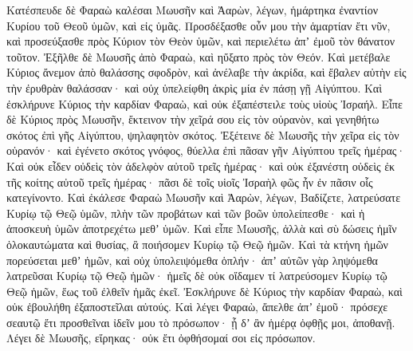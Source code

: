 {\par }{\PP {}Κατέσπευδε δὲ Φαραὼ καλέσαι Μωυσῆν καὶ Ἀαρὼν, λέγων, ἡμάρτηκα ἐναντίον Κυρίου τοῦ Θεοῦ ὑμῶν, καὶ εἰς ὑμᾶς.
Προσδέξασθε οὖν μου τὴν ἁμαρτίαν ἔτι νῦν, καὶ προσεύξασθε πρὸς Κύριον τὸν Θεὸν ὑμῶν, καὶ περιελέτω ἀπʼ ἐμοῦ τὸν θάνατον τοῦτον.
Ἐξῆλθε δὲ Μωυσῆς ἀπὸ Φαραὼ, καὶ ηὔξατο πρὸς τὸν Θεόν.
Καὶ μετέβαλε Κύριος ἄνεμον ἀπὸ θαλάσσης σφοδρὸν, καὶ ἀνέλαβε τὴν ἀκρίδα, καὶ ἔβαλεν αὐτὴν εἰς τὴν ἐρυθρὰν θαλάσσαν· καὶ οὐχ ὑπελείφθη ἀκρὶς μία ἐν πάσῃ γῇ Αἰγύπτου.
Καὶ ἐσκλήρυνε Κύριος τὴν καρδίαν Φαραὼ, καὶ οὐκ ἐξαπέστειλε τοὺς υἱοὺς Ἰσραήλ.
Εἶπε δὲ Κύριος πρὸς Μωυσῆν, ἔκτεινον τὴν χεῖρά σου εἰς τὸν οὐρανὸν, καὶ γενηθήτω σκότος ἐπὶ γῆς Αἰγύπτου, ψηλαφητὸν σκότος.
Ἐξέτεινε δὲ Μωυσῆς τὴν χεῖρα εἰς τὸν οὐρανόν· καὶ ἐγένετο σκότος γνόφος, θύελλα ἐπὶ πᾶσαν γῆν Αἰγύπτου τρεῖς ἡμέρας·
Καὶ οὐκ εἶδεν οὐδεὶς τὸν ἀδελφὸν αὐτοῦ τρεῖς ἡμέρας· καὶ οὐκ ἐξανέστη οὐδεὶς ἐκ τῆς κοίτης αὐτοῦ τρεῖς ἡμέρας· πᾶσι δὲ τοῖς υἱοῖς Ἰσραὴλ φῶς ἦν ἐν πᾶσιν οἷς κατεγίνοντο.
Καὶ ἐκάλεσε Φαραὼ Μωυσῆν καὶ Ἀαρὼν, λέγων, Βαδίζετε, λατρεύσατε Κυρίῳ τῷ Θεῷ ὑμῶν, πλὴν τῶν προβάτων καὶ τῶν βοῶν ὑπολείπεσθε· καὶ ἡ ἀποσκευὴ ὑμῶν ἀποτρεχέτω μεθʼ ὑμῶν.
Καὶ εἶπε Μωυσῆς, ἀλλὰ καὶ σὺ δώσεις ἡμῖν ὁλοκαυτώματα καὶ θυσίας, ἂ ποιήσομεν Κυρίῳ τῷ Θεῷ ἡμῶν.
Καὶ τὰ κτήνη ἡμῶν πορεύσεται μεθʼ ἡμῶν, καὶ οὐχ ὑπολειψόμεθα ὁπλήν· ἀπʼ αὐτῶν γὰρ ληψόμεθα λατρεῦσαι Κυρίῳ τῷ Θεῷ ἡμῶν· ἡμεῖς δὲ οὐκ οἴδαμεν τί λατρεύσομεν Κυρίῳ τῷ Θεῷ ἡμῶν, ἕως τοῦ ἐλθεῖν ἡμᾶς ἐκεῖ.
Ἐσκλήρυνε δὲ Κύριος τὴν καρδίαν Φαραὼ, καὶ οὐκ ἐβουλήθη ἐξαποστεῖλαι αὐτούς.
Καὶ λέγει Φαραὼ, ἄπελθε ἀπʼ ἐμοῦ· πρόσεχε σεαυτῷ ἔτι προσθεῖναι ἰδεῖν μου τὸ πρόσωπον· ᾗ δʼ ἂν ἡμέρᾳ ὀφθῇς μοι, ἀποθανῇ.
Λέγει δὲ Μωυσῆς, εἴρηκας· οὐκ ἔτι ὀφθήσομαί σοι εἰς πρόσωπον.

}
